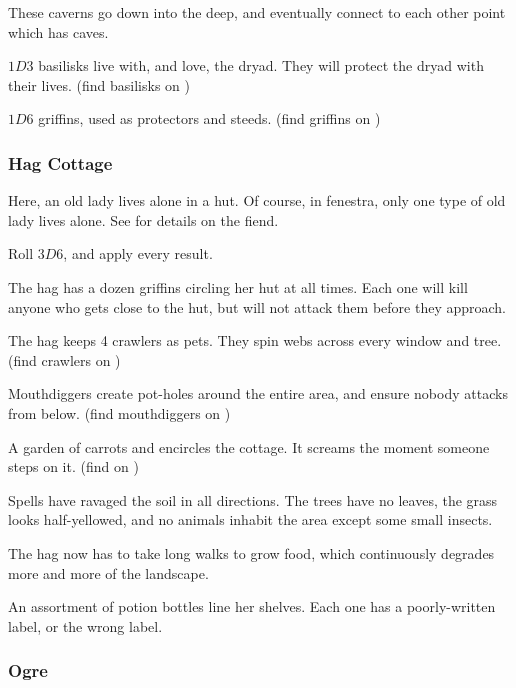 \begin{multicols}{2}
\begin{dlist}
  These caverns go down into the \gls{deep}, and eventually connect to each other point which has caves.
  \item
  $1D3$ \glspl{basilisk} live with, and love, the dryad.
  They will protect the dryad with their lives.
  (find \glspl{basilisk} on )
  \item
  $1D6$ griffins, used as protectors and steeds.
  (find griffins on )
\end{dlist}

\subsubsection{Hag Cottage}
\label{hagPoint}

Here, an old lady lives alone in a hut.
Of course, in \gls{fenestra}, only one type of old lady lives alone.
See  for details on the fiend.

Roll $3D6$, and apply every result.

\begin{dlist}
  \item
  The \gls{hag} has a dozen griffins circling her hut at all times.
  Each one will kill anyone who gets close to the hut, but will not attack them before they approach.
  \item
  The \gls{hag} keeps 4 \glspl{crawler} as pets.
  They spin webs across every window and tree.
  (find \glspl{crawler} on )
  \item
  Mouthdiggers create pot-holes around the entire area, and ensure nobody attacks from below.
  (find mouthdiggers on )
  \item
  A garden of carrots and  encircles the cottage.
  It screams the moment someone steps on it.
  (find  on )
  \item
  Spells have ravaged the soil in all directions.
  The trees have no leaves, the grass looks half-yellowed, and no animals inhabit the area except some small insects.

  The \gls{hag} now has to take long walks to grow food, which continuously degrades more and more of the landscape.
  \item
  An assortment of potion bottles line her shelves.
  Each one has a poorly-written label, or the wrong label.
\end{dlist}

\subsubsection{Ogre}
\label{ogrePoint}


\end{multicols}
